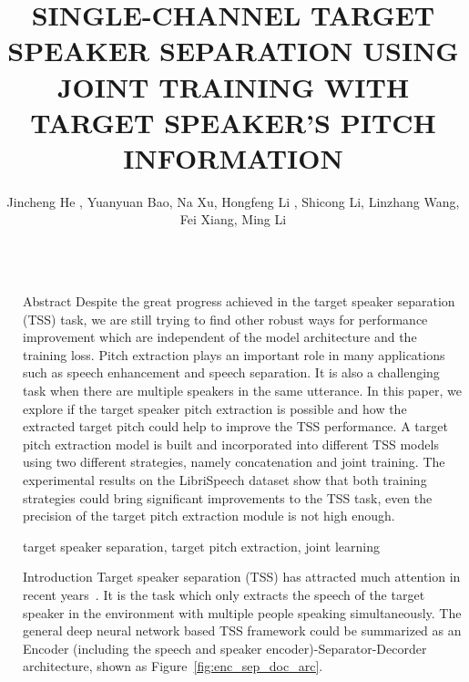 \documentclass[final]{beamer}
\title{SINGLE-CHANNEL TARGET SPEAKER SEPARATION USING JOINT TRAINING WITH TARGET SPEAKER'S PITCH INFORMATION}
\author{Jincheng He \inst{1}, Yuanyuan Bao\inst{1}, Na Xu\inst{2}, Hongfeng Li \inst{2}, Shicong Li\inst{2}, Linzhang Wang\inst{2}, Fei Xiang\inst{2}, Ming Li\inst{1}}
\institute[shortinst]{\inst{1} Data Science Research Center, Duke Kunshan University, Kunshan, China \samelineand \inst{2} Xiaomi, Beijing, China \\ ming.li369@duke.edu}
\newlength{\sepwidth}
\newlength{\colwidth}
\newcommand{\separatorcolumn}{\begin{column}{\sepwidth}\end{column}}
\begin{document}

    \begin{frame}[t]
        \begin{columns}[t]
            \separatorcolumn

            \begin{column}{\colwidth}

                \begin{block}{Abstract}
                    Despite the great progress achieved in the target speaker separation (TSS) task, we are still trying to find other robust ways for performance improvement which are independent of the model architecture and the training loss. Pitch extraction plays an important role in many applications such as speech enhancement and speech separation. It is also a challenging task when there are multiple speakers in the same utterance. In this paper, we explore if the target speaker pitch extraction is possible and how the extracted target pitch could help to improve the TSS performance. A target pitch extraction model is built and incorporated into different TSS models using two different strategies, namely concatenation and joint training. The experimental results on the LibriSpeech dataset show that both training strategies could bring significant improvements to the TSS task, even the precision of the target pitch extraction module is not high enough.

                    \begin{keywords}
                        target speaker separation, target pitch extraction, joint learning
                    \end{keywords}
                \end{block}

                \begin{block}{Introduction}
                    Target speaker separation (TSS) has attracted much attention in recent years~\cite{speakerBeam, compact_speakerbeam, voicefilter, li20p_interspeech, time_domain_speaker_ex_net, spex, spex+, speakerfilter, speakerfilter_pro}.
                    It is the task which only extracts the speech of the target speaker in the environment with multiple people speaking simultaneously.
                    The general deep neural network based TSS framework could be summarized as an Encoder (including the speech and speaker encoder)-Separator-Decorder architecture, shown as Figure~\ref{fig:enc_sep_doc_arc}.


\end{block}
\end{column}
\end{columns}
\end{frame}
\end{document}
